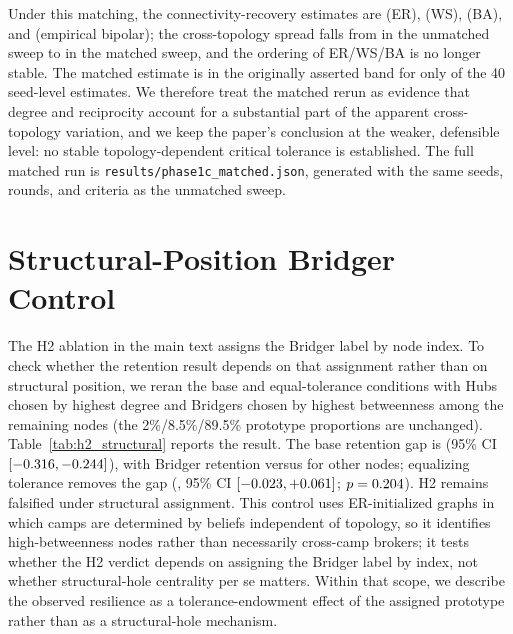 Under this matching, the connectivity-recovery estimates are
\MatchedFragErdosRenyi{} (ER), \MatchedFragSmallWorld{} (WS),
\MatchedFragScaleFree{} (BA), and \MatchedFragEmpiricalBipolar{} (empirical bipolar); the
cross-topology spread falls from \ThresholdFragSpread{} in the unmatched sweep to
\MatchedFragSpread{} in the matched sweep, and the ordering of ER/WS/BA is no longer stable.
The matched estimate is in the originally asserted band for only \MatchedInBandFrag{} of the
40 seed-level estimates. We therefore treat the matched rerun as evidence that degree and
reciprocity account for a substantial part of the apparent cross-topology variation, and we
keep the paper's conclusion at the weaker, defensible level: no stable topology-dependent
critical tolerance is established. The full matched run is
\texttt{results/phase1c\_matched.json}, generated with the same seeds, rounds, and criteria as
the unmatched sweep.

\begin{table}[t]
\centering
\small
\caption{\textbf{Degree- and reciprocity-matched Phase~1c rerun.} All four topologies are
matched to the same initial mean out-degree and reciprocity; censored estimates are shown in
parentheses. Generated from \texttt{results/phase1c\_matched.json} by
\texttt{scripts/generate\_paper\_tables.py}.}
\label{tab:matched_threshold}

\end{table}

\section{Structural-Position Bridger Control}
\label{app:h2-structural}

The H2 ablation in the main text assigns the Bridger label by node index. To check whether
the retention result depends on that assignment rather than on structural position, we
reran the base and equal-tolerance conditions with Hubs chosen by highest degree and
Bridgers chosen by highest betweenness among the remaining nodes (the 2\%/8.5\%/89.5\%
prototype proportions are unchanged). Table~\ref{tab:h2_structural} reports the result.
The base retention gap is \HTwoStructuralBaseGap{} (95\% CI
$[-0.316, -0.244]$), with Bridger retention
\HTwoStructuralBaseBridger{} versus \HTwoStructuralBaseOther{} for other nodes; equalizing
tolerance removes the gap (\HTwoStructuralEqualGap{}, 95\% CI
$[-0.023, +0.061]$; $p=0.204$). H2
remains falsified under structural assignment. This control uses ER-initialized graphs in
which camps are determined by beliefs independent of topology, so it identifies
high-betweenness nodes rather than necessarily cross-camp brokers; it tests whether the H2
verdict depends on assigning the Bridger label by index, not whether structural-hole
centrality per se matters. Within that scope, we describe the observed resilience as a
tolerance-endowment effect of the assigned prototype rather than as a structural-hole
mechanism.

